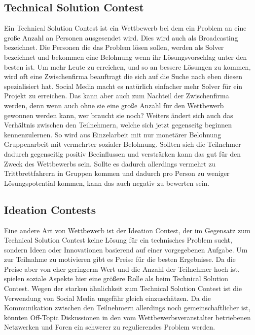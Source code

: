 \subsection{Technical Solution Contest}
Ein Technical Solution Contest ist ein Wettbewerb bei dem ein Problem an eine gro\ss{}e Anzahl an Personen ausgesendet wird. Dies wird auch als Broadcasting bezeichnet. Die Personen die das Problem l\"osen sollen, werden als Solver bezeichnet und bekommen eine Belohnung wenn ihr L\"osungsvorschlag unter den besten ist. Um mehr Leute zu erreichen, und so an bessere L\"osungen zu kommen, wird oft eine Zwischenfirma beauftragt die sich auf die Suche nach eben diesen spezialisiert hat.
Social Media macht es nat\"urlich einfacher mehr Solver f\"ur ein Projekt zu erreichen. Das kann aber auch zum Nachteil der Zwischenfirma werden, denn wenn auch ohne sie eine gro\ss{}e Anzahl f\"ur den Wettbewerb gewonnen werden kann, wer braucht sie noch? Weiters \"andert sich auch das Verh\"altnis zwischen den Teilnehmern, welche sich jetzt gegenseitg beginnen kennenzulernen. So wird aus Einzelarbeit mit nur monet\"arer Belohnung Gruppenarbeit mit vermehrter sozialer Belohnung. Sollten sich die Teilnehmer dadurch gegenseitig positiv Beeinflussen und verstr\"arken kann das gut f\"ur den Zweck des Wettbewerbs sein. Sollte es dadurch allerdings vermehrt zu Trittbrettfahrern in Gruppen kommen und dadurch pro Person zu weniger L\"osungspotential kommen, kann das auch negativ zu bewerten sein.

\subsection{Ideation Contests}
Eine andere Art von Wettbewerb ist der Ideation Contest, der im Gegensatz zum Technical Solution Contest keine L\"osung f\"ur ein technisches Problem sucht, sondern Ideen oder Innovationen basierend auf einer vorgegebenen Aufgabe. Um zur Teilnahme zu motivieren gibt es Preise f\"ur die besten Ergebnisse. Da die Preise aber von eher geringerm Wert und die Anzahl der Teilnehmer hoch ist, spielen soziale Aspekte hier eine gr\"o\ss{}ere Rolle als beim Technical Solution Contest.
Wegen der starken \"ahnlichkeit zum  Technical Solution Contest ist die Verwendung von Social Media ungef\"ahr gleich einzusch\"atzen. Da die Kommunikation zwischen den Teilnehmern allerdings noch gemeinschaftlicher ist, k\"onnten Off-Topic Diskussionen in den vom Wettbewerbsveranstalter betriebenen Netzwerken und Foren ein schwerer zu regulierendes Problem werden.